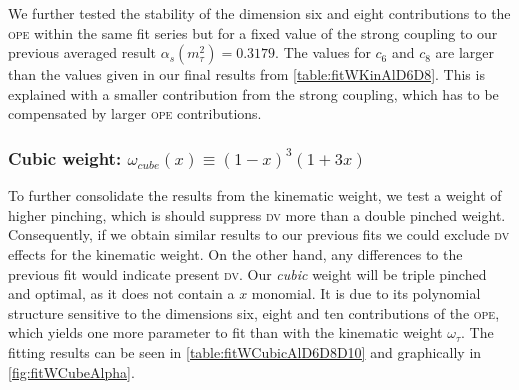 \documentclass[../../index.tex]{subfiles}
\begin{document}
We further tested the stability of the dimension six and eight contributions to
the \textsc{ope} within the same fit series but for a fixed value of the strong coupling
to our previous averaged result \(\alpha_s(m_\tau^2)=0.3179\). The values for
\(c_6\) and \(c_8\) are larger than the values given in our final results from
\cref{table:fitWKinAlD6D8}. This is explained with a smaller contribution from
the strong coupling, which has to be compensated by larger \textsc{ope} contributions.

\subsubsection{Cubic weight: \(\omega_{cube}(x) \equiv (1-x)^3(1+3x)\)}
\label{sec:cubicWeight}
To further consolidate the results from the kinematic weight, we test a weight
of higher pinching, which is should suppress \textsc{dv} more than a double
pinched weight. Consequently, if we obtain similar results to our previous fits
we could exclude \textsc{dv} effects for the kinematic weight. On the other
hand, any differences to the previous fit would indicate present \textsc{dv}.
Our \textit{cubic} weight will be triple pinched and optimal, as it does not
contain a \(x\) monomial. It is due to its polynomial structure sensitive to the
dimensions six, eight and ten contributions of the \textsc{ope}, which yields
one more parameter to fit than with the kinematic weight \(\omega_\tau\). The
fitting results can be seen in \cref{table:fitWCubicAlD6D8D10} and graphically
in \cref{fig:fitWCubeAlpha}.
\end{document}
